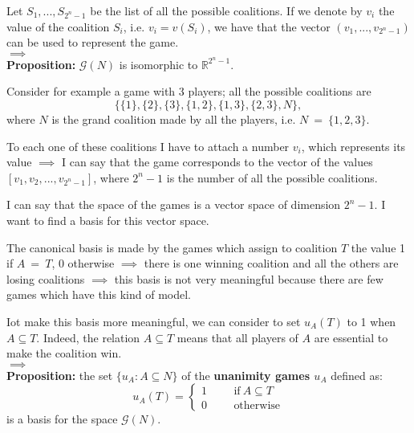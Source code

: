 \noindent Let $S_1,...,S_{2^n-1}$ be the list of all the possible coalitions. If we denote by $v_i$ the value of the coalition $S_i$, i.e. $v_i = v(S_i)$, we have that the vector $(v_1,...,v_{2^n-1})$ can be used to represent the game.\\
$\implies$\\
\textbf{Proposition:} $\mathcal{G}(N)$ is isomorphic to $\mathbb{R}^{2^n-1}$.

\bigskip
\noindent Consider for example a game with 3 players; all the possible 
coalitions are
\[
	\{\{1\}, \{2\}, \{3\}, \{1,2\}, \{1,3\}, \{2,3\}, N\},
\]
where $N$ is the grand coalition made by all the players, i.e. $N~=~\{1,2,3\}$.

\noindent To each one of these coalitions I have to attach a number $v_i$, 
which represents its value $\implies$ I can say that the game corresponds to the 
vector of the values $[v_1, v_2, ..., v_{2^n-1}]$, where $2^n-1$ is the 
number of all the possible coalitions.

\noindent I can say that the space of the games is a vector space of 
dimension $2^n-1$. I want to find a basis for this vector space.

\noindent The canonical basis is made by the games which assign to coalition 
$T$ the value 1 if $A~=~T$, 0 otherwise $\implies$ there is one winning coalition 
and all the others are losing coalitions $\implies$ this basis is not very 
meaningful because there are few games which have this kind of model.

\noindent Iot make this basis more meaningful, we can consider to set $u_A(T)$ 
to 1 when $A \subseteq T$. Indeed, the relation $A \subseteq T$ means that 
all players of $A$ are essential to make the coalition win.\\
$\implies$\\
\textbf{Proposition:} the set $\{u_A: A \subseteq N\}$ of the \textbf{unanimity games $u_A$} defined as:
\[
	u_A(T) = \begin{cases}
					1 \hspace{1cm} \text{if} ~A \subseteq T\\
					0 \hspace{1cm} \text{otherwise}
				  \end{cases}
\]
is a basis for the space $\mathcal{G}(N)$.


